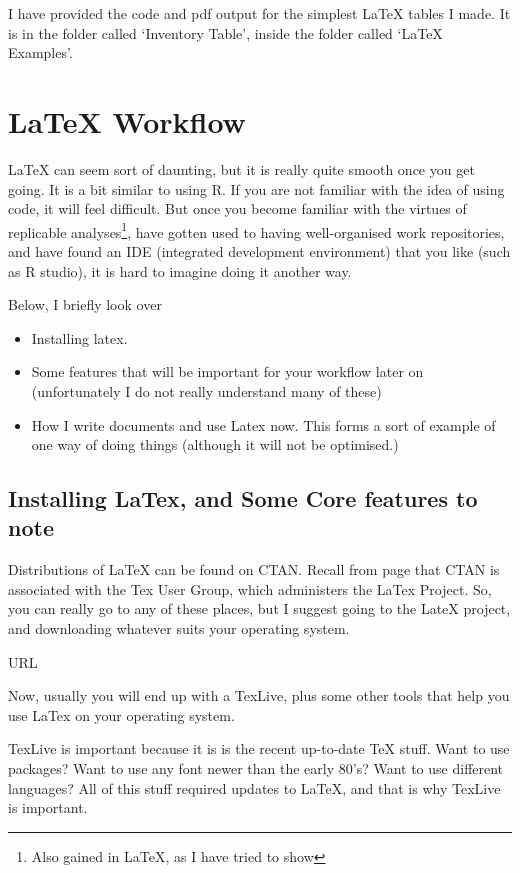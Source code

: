 \documentclass[12pt, oneside]{memoir}
\begin{document}
I have provided the code and pdf output for the simplest \LaTeX{} tables I made. It is in the folder called `Inventory Table', inside the folder called `LaTeX Examples'.

\chapter{\LaTeX{} Workflow}

\LaTeX{} can seem sort of daunting, but it is really quite smooth once you get going. It is a bit similar to using R. If you are not familiar with the idea of using code, it will feel difficult. But once you become familiar with the virtues of replicable analyses\footnote{Also gained in LaTeX, as I have tried to show}, have gotten used to having well-organised work repositories, and have found an IDE (integrated development environment) that you like (such as R studio), it is hard to imagine doing it another way.

Below, I briefly look over
\begin{itemize}
    \item Installing latex.
    \item Some features that will be important for your workflow later on (unfortunately I do not really understand many of these)
    \item How I write documents and use Latex now. This forms a sort of example of one way of doing things (although it will not be optimised.)
\end{itemize}

\section{Installing LaTex, and Some Core features to note}

Distributions of LaTeX can be found on CTAN. Recall from page \pageref{TUG} that CTAN is associated with the Tex User Group, which administers the LaTex Project. So, you can really go to any of these places, but I suggest going to the LateX project, and downloading whatever suits your operating system.

URL

Now, usually you will end up with a TexLive, plus some other tools that help you use LaTex on your operating system.

TexLive is important because it is is the recent up-to-date TeX stuff. Want to use packages? Want to use any font newer than the early 80's? Want to use different languages? All of this stuff required updates to LaTeX, and that is why TexLive is important.
\end{document}
